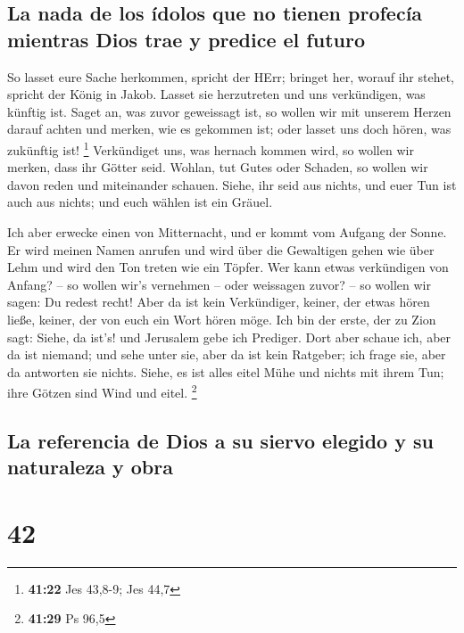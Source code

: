 \hypertarget{la-nada-de-los-uxeddolos-que-no-tienen-profecuxeda-mientras-dios-trae-y-predice-el-futuro}{%
\subsection{La nada de los ídolos que no tienen profecía mientras Dios
trae y predice el
futuro}\label{la-nada-de-los-uxeddolos-que-no-tienen-profecuxeda-mientras-dios-trae-y-predice-el-futuro}}

 So lasset eure Sache herkommen, spricht der HErr;
bringet her, worauf ihr stehet, spricht der König in Jakob.
 Lasset sie herzutreten und uns verkündigen, was künftig
ist. Saget an, was zuvor geweissagt ist, so wollen wir mit unserem
Herzen darauf achten und merken, wie es gekommen ist; oder lasset uns
doch hören, was zukünftig ist! \footnote{\textbf{41:22} Jes 43,8-9; Jes
  44,7}  Verkündiget uns, was hernach kommen wird, so
wollen wir merken, dass ihr Götter seid. Wohlan, tut Gutes oder Schaden,
so wollen wir davon reden und miteinander schauen. 
Siehe, ihr seid aus nichts, und euer Tun ist auch aus nichts; und euch
wählen ist ein Gräuel.

 Ich aber erwecke einen von Mitternacht, und er kommt vom
Aufgang der Sonne. Er wird meinen Namen anrufen und wird über die
Gewaltigen gehen wie über Lehm und wird den Ton treten wie ein Töpfer.
 Wer kann etwas verkündigen von Anfang? -- so wollen
wir's vernehmen -- oder weissagen zuvor? -- so wollen wir sagen: Du
redest recht! Aber da ist kein Verkündiger, keiner, der etwas hören
ließe, keiner, der von euch ein Wort hören möge.  Ich bin
der erste, der zu Zion sagt: Siehe, da ist's! und Jerusalem gebe ich
Prediger.  Dort aber schaue ich, aber da ist niemand; und
sehe unter sie, aber da ist kein Ratgeber; ich frage sie, aber da
antworten sie nichts.  Siehe, es ist alles eitel Mühe und
nichts mit ihrem Tun; ihre Götzen sind Wind und eitel. \footnote{\textbf{41:29}
  Ps 96,5}

\hypertarget{la-referencia-de-dios-a-su-siervo-elegido-y-su-naturaleza-y-obra}{%
\subsection{La referencia de Dios a su siervo elegido y su naturaleza y
obra}\label{la-referencia-de-dios-a-su-siervo-elegido-y-su-naturaleza-y-obra}}

\hypertarget{section-41}{%
\section{42}\label{section-41}}

